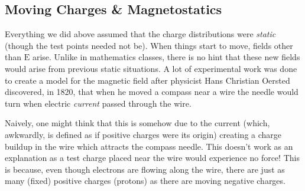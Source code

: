 \documentclass[10pt, twocolumn]{article}
\theoremstyle{definition}
\newcommand{\bv}[1]{\bm{\mathrm{#1}}}
\begin{document}
\subsection{Moving Charges \& Magnetostatics}
Everything we did above assumed that the charge distributions were \emph{static} (though the test points needed not be).
When things start to move, fields other than $\bv{E}$ arise. Unlike in mathematics classes, there is no hint that these new fields
would arise from previous static situations. A lot of experimental work was done to create a model for the magnetic field after
physicist Hans Christian Oersted discovered, in 1820, that when he moved a compass near a wire the needle would turn when electric \emph{current} passed through the wire.

Naively, one might think that this is somehow due to the current (which, awkwardly, is defined as if positive charges were its origin) creating a
charge buildup in the wire which attracts the compass needle. This doesn't work as an explanation as a test charge placed near the wire would experience
no force! This is because, even though electrons are flowing along the wire, there are just as many (fixed) positive charges (protons)
as there are moving negative charges.
\end{document}
